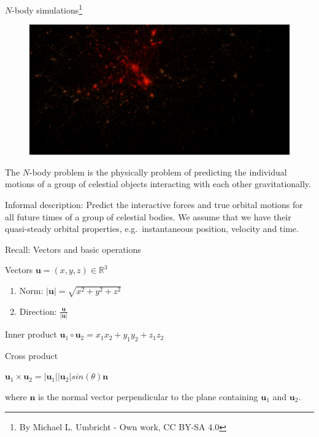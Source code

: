 \documentclass[\classoption]{beamer}
\begin{document}
\begin{frame}{$N$-body simulations\footnote{\tiny By Michael L. Umbricht - Own work, CC BY-SA 4.0}}

\begin{figure}
\includegraphics[width=0.5\linewidth]{./images/Galaxy_cluster_sim.png}
\end{figure}


The $N$-body problem is the physically problem of predicting the individual motions of a group of celestial objects interacting with each other gravitationally.

\begin{block}{Informal description:}
Predict the interactive forces and true orbital motions for all future times of a group of celestial bodies. We assume that we have their quasi-steady orbital properties, e.g.\ instantaneous position, velocity and time.
\end{block}

\end{frame}


\begin{frame}{Recall: Vectors and basic operations}


\begin{block}{Vectors}
\centering
$\mathbf{u}=(x,y,z)\in \mathbb{R}^3$\\
\begin{enumerate}
\item Norm: $\vert \mathbf{u} \vert = \sqrt{x^2+y^2+z^2}$
\item Direction: $\frac{\mathbf{u}}{\vert \mathbf{u}\vert}$
\end{enumerate}
\end{block}
\begin{block}{Inner product}
\centering
$\mathbf{u}_1 \circ \mathbf{u}_2 = x_1x_2 + y_1y_2 + z_1z_2 $
\end{block}
\begin{block}{Cross product}

\begin{center}
$\mathbf{u}_1 \times \mathbf{u}_2 = \vert\mathbf{u}_1 \vert \vert\mathbf{u}_2 \vert sin(\theta) \mathbf{n}  $
\end{center}
where $\mathbf{n}$ is the normal vector perpendicular to the plane containing $\mathbf{u}_1$ and $\mathbf{u}_2$.
\end{block}

\end{frame}
\end{document}
